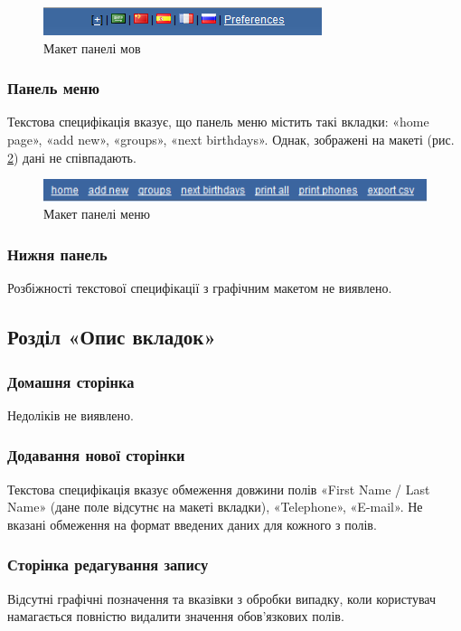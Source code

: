 \documentclass[a4paper,oneside,12pt,DIV=12,titlepage,toc]{scrartcl}
\begin{document}
				\begin{figure}[h]
					\centering
					\includegraphics{01.png}
					\caption{Макет панелі мов}\label{fig:langpanel}
				\end{figure}
				
			\subsubsection{Панель меню}
				Текстова специфікація вказує, що панель меню містить такі вкладки: «home page», «add new», «groups», «next birthdays». Однак, зображені на макеті (рис. \ref{fig:menupanel}) дані не співпадають.
				
				\begin{figure}[h]
					\centering
					\includegraphics{02.png}
					\caption{Макет панелі меню}\label{fig:menupanel}
				\end{figure}
				
			\subsubsection{Нижня панель}
				Розбіжності текстової специфікації з графічним макетом не виявлено.
			
		\subsection{Розділ «Опис вкладок»}
			\subsubsection{Домашня сторінка}
				Недоліків не виявлено.
			
			\subsubsection{Додавання нової сторінки}
				Текстова специфікація вказує обмеження довжини полів «First Name / Last Name» (дане поле відсутнє на макеті вкладки), «Telephone», «E-mail». Не вказані обмеження на формат введених даних для кожного з полів.
				
			\subsubsection{Сторінка редагування запису}
				Відсутні графічні позначення та вказівки з обробки випадку, коли користувач намагається повністю видалити значення обов'язкових полів.
			
\end{document}
